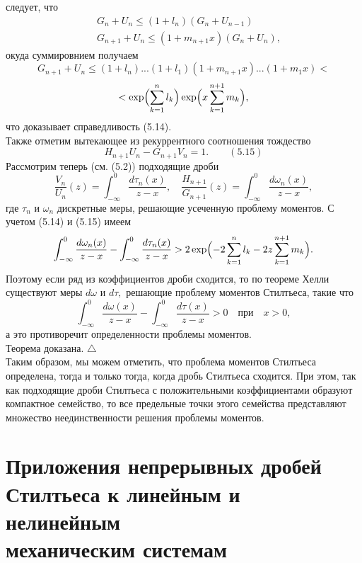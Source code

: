 \documentclass[12 pt, a4 paper]{article}
\theoremstyle{plain}   \newtheorem{Pro}{Задача}
\begin{document}
следует, что
\begin{align*}
  \; & G_n +U_n \leqslant (1+l_n )
    (G_n +U_{n-1}) \\
  \; & G_{n+1}+U_n \leqslant (1+m_{n+1}x )
    (G_n +U_n ) ,
\end{align*}
окуда суммировнием получаем
$$
  G_{n+1}+U_n \leqslant (1+l_n )...(1+l_1 )
    (1+m_{n+1}x)...(1+m_1 x) <
$$
$$
  < \exp \Bigl ( \sum _{k=1}^n l_k \Bigr )
    \exp \Bigl ( x \sum _{k=1}^{n+1} m_k \Bigr ) ,
$$
что доказывает справедливость (5.14).\\
Также отметим вытекающее из рекуррентного соотношения
тождество
$$
  H_{n+1}U_n -G_{n+1}V_n =1. \qquad (5.15)
$$
Рассмотрим теперь (см. (5.2)) подходящие дроби
$$
  \frac{V_n}{U_n}(z)=\int _{-\infty}^0
    \frac{d\tau _n (x)}{z-x}, \quad
	  \frac{H_{n+1}}{G_{n+1}}(z)=
	    \int _{-\infty}^0
		  \frac{d \omega _n (x)}{z-x},
$$
где
$ \tau _n $
и
$ \omega _n $
дискретные меры, решающие усеченную проблему моментов.
С учетом (5.14) и (5.15) имеем
$$
  \int _{-\infty}^0 \frac{d\omega _n (x)}{z-x}-
    \int _{-\infty}^0 \frac{d\tau _n (x)}{z-x} >
	  2 \exp \Bigl ( -2 \sum _{k=1}^n l_k -
	    2z \sum _{k=1}^{n+1} m_k \Bigr ) .
$$
Поэтому если ряд из коэффициентов дроби сходится, то
по теореме Хелли существуют меры
$ d \omega $
и
$ d \tau , $
решающие проблему моментов Стилтьеса, такие что
$$
  \int _{-\infty}^0 \frac{d\omega (x)}{z-x} -
  \int _{-\infty}^0 \frac{d\tau (x)}{z-x} >0
  \quad \mathrm{при} \quad x>0,
$$
а это противоречит определенности проблемы моментов.\\
Теорема доказана. $ \triangle $\\
Таким образом, мы можем отметить, что проблема
моментов Стилтьеса определена,
тогда и только тогда, когда
дробь Стилтьеса сходится.
При этом, так как подходящие дроби Стилтьеса
с положительными коэффициентами
образуют компактное семейство,
то все предельные точки этого семейства
представляют множество неединственности
решения проблемы моментов.
\newpage
\section{Приложения непрерывных дробей \\
Стилтьеса к линейным
и нелинейным \\
механическим системам}
\end{document}
